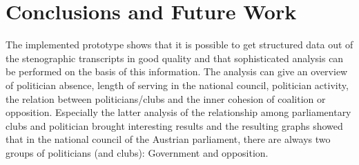 \chapter{Conclusions and Future Work}
\label{chap:conclusion}

The implemented prototype shows that it is possible to get structured data out of the stenographic transcripts in good quality and that sophisticated analysis can be performed on the basis of this information. The analysis can give an overview of politician absence, length of serving in the national council, politician activity, the relation between politicians/clubs and the inner cohesion of coalition or opposition. Especially the latter analysis of the relationship among parliamentary clubs and politician brought interesting results and the resulting graphs showed that in the national council of the Austrian parliament, there are always two groups of politicians (and clubs): Government and opposition.

